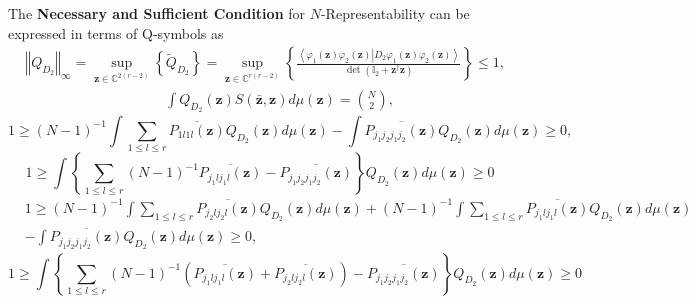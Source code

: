 \documentclass[aps,preprint]{revtex4}%
\begin{document}
The \textbf{Necessary and Sufficient Condition }for $N$-Representability can
be expressed in terms of Q-symbols as
\begin{align}
&  \left\Vert Q_{D_{2}}\right\Vert _{\infty}=\sup_{\mathbf{z\in}%
\mathbb{C}^{2\left(  r-2\right)  }}\left\{  \tilde{Q}_{D_{2}}\right\}
=\sup_{\mathbf{z\in}\mathbb{C}^{r\left(  r-2\right)  }}\left\{  \frac
{\left\langle \varphi_{1}\left(  \mathbf{z}\right)  \varphi_{2}\left(
\mathbf{z}\right)  \left\vert D_{2}\varphi_{1}\left(  \mathbf{z}\right)
\varphi_{2}\left(  \mathbf{z}\right)  \right.  \right\rangle }{\det\left(
\mathbb{I}_{2}+\mathbf{z}^{\dagger}\mathbf{z}\right)  }\right\}
\leq1,\nonumber\\
&  \qquad\qquad\qquad\qquad\qquad\int Q_{D_{2}}\left(  \mathbf{z}\right)
S\left(  \mathbf{\bar{z},z}\right)  d\mu\left(  \mathbf{z}\right)  =\binom
{N}{2},\nonumber
\end{align}%
\begin{equation}
1\geq\left(  N-1\right)  ^{-1}\int\sum_{1\leq l\leq r}\overline{P_{1l1l}%
\left(  \mathbf{z}\right)  }Q_{D_{2}}\left(  \mathbf{z}\right)  d\mu\left(
\mathbf{z}\right)  -\int\overline{P_{j_{1}j_{2}j_{1}j_{2}}\left(
\mathbf{z}\right)  }Q_{D_{2}}\left(  \mathbf{z}\right)  d\mu\left(
\mathbf{z}\right)  \geq0,
\end{equation}%
\begin{equation}
1\geq\int\left\{  \sum_{1\leq l\leq r}\left(  N-1\right)  ^{-1}\overline
{P_{j_{1}lj_{1}l}\left(  \mathbf{z}\right)  }-\overline{P_{j_{1}j_{2}%
j_{1}j_{2}}\left(  \mathbf{z}\right)  }\right\}  Q_{D_{2}}\left(
\mathbf{z}\right)  d\mu\left(  \mathbf{z}\right)  \geq0
\end{equation}%
\begin{align}
&  1\geq\left(  N-1\right)  ^{-1}\int\sum_{1\leq l\leq r}\overline
{P_{j_{2}lj_{2}l}\left(  \mathbf{z}\right)  }Q_{D_{2}}\left(  \mathbf{z}%
\right)  d\mu\left(  \mathbf{z}\right)  +\left(  N-1\right)  ^{-1}\int%
\sum_{1\leq l\leq r}\overline{P_{j_{1}lj_{1}l}\left(  \mathbf{z}\right)
}Q_{D_{2}}\left(  \mathbf{z}\right)  d\mu\left(  \mathbf{z}\right) \nonumber\\
&  \left.  -\right.  \int\overline{P_{j_{1}j_{2}j_{1}j_{2}}\left(
\mathbf{z}\right)  }Q_{D_{2}}\left(  \mathbf{z}\right)  d\mu\left(
\mathbf{z}\right)  \geq0,
\end{align}%
\begin{equation}
1\geq\int\left\{  \sum_{1\leq l\leq r}\left(  N-1\right)  ^{-1}\left(
\overline{P_{j_{1}lj_{1}l}\left(  \mathbf{z}\right)  }+\overline
{P_{j_{2}lj_{2}l}\left(  \mathbf{z}\right)  }\right)  -\overline{P_{j_{1}%
j_{2}j_{1}j_{2}}\left(  \mathbf{z}\right)  }\right\}  Q_{D_{2}}\left(
\mathbf{z}\right)  d\mu\left(  \mathbf{z}\right)  \geq0
\end{equation}%
\end{document}
